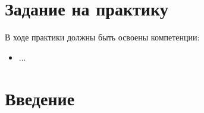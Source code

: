 \section{Задание на практику}
	В ходе практики должны быть освоены компетенции:
		\begin{itemize}
			\item ...
		\end{itemize}

\newpage
\section{Введение}
